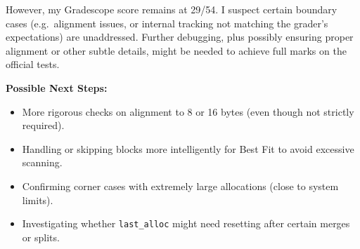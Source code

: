 \documentclass[11pt]{article}
\begin{document}
However, my Gradescope score remains at 29/54. I suspect certain boundary cases (e.g.\ alignment issues, or internal tracking not matching the grader’s expectations) are unaddressed. Further debugging, plus possibly ensuring proper alignment or other subtle details, might be needed to achieve full marks on the official tests.

\vspace{6pt}
\noindent \textbf{Possible Next Steps:}
\begin{itemize}
    \item More rigorous checks on alignment to 8 or 16 bytes (even though not strictly required).
    \item Handling or skipping blocks more intelligently for Best Fit to avoid excessive scanning.
    \item Confirming corner cases with extremely large allocations (close to system limits).
    \item Investigating whether \texttt{last\_alloc} might need resetting after certain merges or splits.
\end{itemize}
\end{document}

